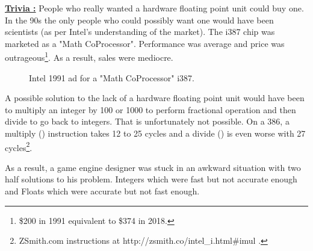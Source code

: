 \documentclass[book.tex]{subfiles}
\begin{document}
\textbf{\underline{Trivia :}} People who really wanted a hardware floating point unit could buy one. In the 90s the only people who could possibly want one would have been scientists (as per Intel's understanding of the market). The i387 chip was marketed as a "Math CoProcessor". Performance was average and price was outrageous\footnote{\$200 in 1991 equivalent to \$374 in 2018.}. As a result, sales were mediocre.\\
\begin{figure}[H]
\centering
  
  
\caption{Intel 1991 ad for a "Math CoProcessor" i387.}
\label{fig:fp_internals}
\end{figure}



\par
A possible solution to the lack of a hardware floating point unit would have been to multiply an integer by 100 or 1000 to perform fractional operation and then divide to go back to integers. That is unfortunately not possible. On a 386, a multiply () instruction takes 12 to 25 cycles and a divide () is even worse with 27 cycles\footnote{ZSmith.com instructions at http://zsmith.co/intel\_i.html\#imul .}.\\ 
\par
As a result, a game engine designer was stuck in an awkward situation with two half solutions to his problem. Integers which were fast but not accurate enough and Floats which were accurate but not fast enough.\\
\par
  
\end{document}
